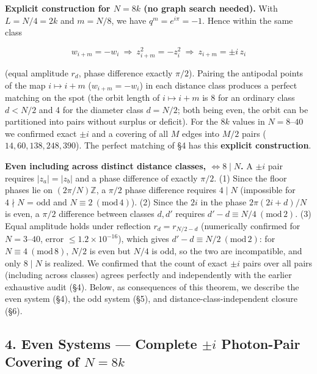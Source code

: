 \documentclass[
  a4paper,
]{ltjsarticle}
\begin{document}
\textbf{Explicit construction for \(N=8k\) (no graph search needed).}
With \(L=N/4=2k\) and \(m=N/8\), we have \(q^m=e^{i\pi}=-1\). Hence
within the same class

\[w_{i+m}=-w_i\ \Longrightarrow\ z_{i+m}^2=-z_i^2\ \Longrightarrow\ z_{i+m}=\pm i\,z_i\]

(equal amplitude \(r_d\), phase difference exactly \(\pi/2\)). Pairing
the antipodal points of the map \(i\mapsto i+m\) (\(w_{i+m}=-w_i\)) in
each distance class produces a perfect matching on the spot (the orbit
length of \(i\mapsto i+m\) is 8 for an ordinary class \(d<N/2\) and 4
for the diameter class \(d=N/2\); both being even, the orbit can be
partitioned into pairs without surplus or deficit). For the \(8k\)
values in \(N=8\)--\(40\) we confirmed exact \(\pm i\) and a covering of
all \(M\) edges into \(M/2\) pairs (\(14,60,138,248,390\)). The perfect
matching of §4 has this \textbf{explicit construction}.

\textbf{Even including across distinct distance classes,
\(\iff 8\mid N\).} A \(\pm i\) pair requires \(|z_a|=|z_b|\) and a phase
difference of exactly \(\pi/2\). (1) Since the floor phases lie on
\((2\pi/N)\mathbb Z\), a \(\pi/2\) phase difference requires \(4\mid N\)
(impossible for \(4\nmid N\) = odd and \(N\equiv2\ (\mathrm{mod}\,4)\)).
(2) Since the \(2i\) in the phase \(2\pi(2i+d)/N\) is even, a \(\pi/2\)
difference between classes \(d,d'\) requires
\(d'-d\equiv N/4\ (\mathrm{mod}\,2)\). (3) Equal amplitude holds under
reflection \(r_d=r_{N/2-d}\) (numerically confirmed for \(N=3\)--\(40\),
error \(\le1.2\times10^{-16}\)), which gives
\(d'-d\equiv N/2\ (\mathrm{mod}\,2)\): for
\(N\equiv4\ (\mathrm{mod}\,8)\), \(N/2\) is even but \(N/4\) is odd, so
the two are incompatible, and only \(8\mid N\) is realized. We confirmed
that the count of exact \(\pm i\) pairs over all pairs (including across
classes) agrees perfectly and independently with the earlier exhaustive
audit (§4). Below, as consequences of this theorem, we describe the even
system (§4), the odd system (§5), and distance-class-independent closure
(§6).

\subsection{\texorpdfstring{4. Even Systems --- Complete \(\pm i\)
Photon-Pair Covering of
\(N=8k\)}{4. Even Systems --- Complete \textbackslash pm i Photon-Pair Covering of N=8k}}\label{even-systems-complete-pm-i-photon-pair-covering-of-n8k}
\end{document}
